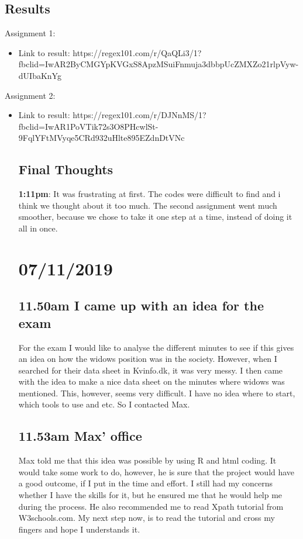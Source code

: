 \documentclass{article}
\begin{document}
\subsection{Results}
Assignment 1: 
\begin{itemize}
\item Link to result: https://regex101.com/r/QaQLi3/1?fbclid=IwAR2ByCMGYpKVGxS8ApzMSuiFnmuja3dbbpUcZMXZo21rlpVyw-dUIbaKnYg 
\end{itemize}
Assignment 2:
\begin{itemize}
\item Link to result: https://regex101.com/r/DJNnMS/1?fbclid=IwAR1PoVTik72s3O8PHcwlSt-9FqlYFtMVyqe5CRd932uHlte895EZdnDtVNc 
\subsection{Final Thoughts}

\textbf{1:11pm}: It was frustrating at first. The codes were difficult to find and i think we thought about it too much. The second assignment went much smoother, because we chose to take it one step at a time, instead of doing it all in once. 


\section{07/11/2019}

\subsection{11.50am I came up with an idea for the exam}

For the exam I would like to analyse the different minutes to see if this gives an idea on how the widows position was in the society. However, when I searched for their data sheet in Kvinfo.dk, it was very messy. I then came with the idea to make a nice data sheet on the minutes where widows was mentioned. This, however, seems very difficult. I have no idea where to start, which tools to use and etc. So I contacted Max. 

\subsection{11.53am Max' office}

Max told me that this idea was possible by using R and html coding. It would take some work to do, however, he is sure that the project would have a good outcome, if I put in the time and effort. I still had my concerns whether I have the skills for it, but he ensured me that he would help me during the process. He also recommended me to read Xpath tutorial from W3schools.com. My next step now, is to read the tutorial and cross my fingers and hope I understands it. 


\end{itemize}
\end{document}
